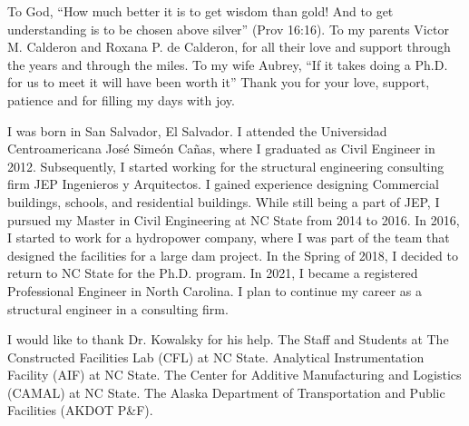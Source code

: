 \maketitlepage

\begin{dedication}
\centering
To God, ``How much better it is to get wisdom than gold! And to get understanding is to be chosen above silver'' (Prov 16:16). 
 \newline To my parents Victor M. Calderon and Roxana P. de Calderon, for all their love and support through the years and through the miles. 
 \newline To my wife Aubrey, ``If it takes doing a Ph.D. for us to meet it will have been worth it'' Thank you for your love, support, patience and for filling my days with joy.
\end{dedication}
%
\begin{biography}
I was born in San Salvador, El Salvador. I attended the Universidad Centroamericana José Simeón Cañas, where I graduated as Civil Engineer in 2012. Subsequently, I started working for the structural engineering consulting firm JEP Ingenieros y Arquitectos. I gained experience designing Commercial buildings, schools, and residential buildings. While still being a part of JEP, I pursued my Master in Civil Engineering at NC State from 2014 to 2016. In 2016, I started to work for a hydropower company, where I was part of the team that designed the facilities for a large dam project. In the Spring of 2018, I decided to return to NC State for the Ph.D. program. In 2021, I became a registered Professional Engineer in North Carolina. I plan to continue my career as a structural engineer in a consulting firm.
\end{biography}
%
\begin{acknowledgements}
I would like to thank Dr. Kowalsky for his help. The Staff and Students at The Constructed Facilities Lab (CFL) at NC State. Analytical Instrumentation Facility (AIF) at NC State. The Center for Additive Manufacturing and Logistics (CAMAL) at NC State. The Alaska Department of Transportation and Public Facilities (AKDOT P\&F).
\end{acknowledgements}


\thesistableofcontents

\thesislistoftables

\thesislistoffigures
